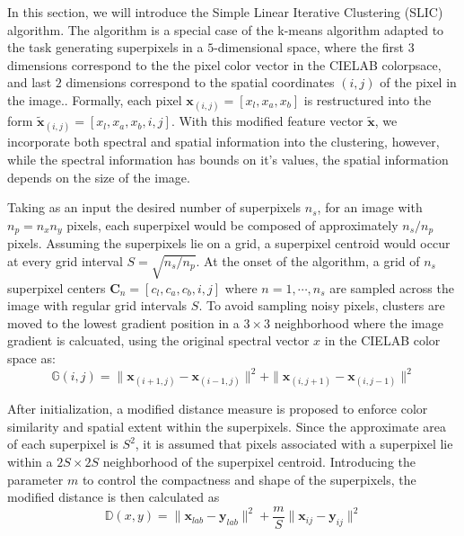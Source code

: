 In this section, we will introduce the Simple Linear Iterative Clustering (SLIC) algorithm. The algorithm is a special case of the k-means algorithm adapted to the task generating superpixels in a $5$-dimensional space, where the first $3$ dimensions correspond to the the pixel color vector in the CIELAB colorpsace, and last $2$ dimensions correspond to the spatial coordinates $(i,j)$ of the pixel in the image.. Formally, each pixel $\mathbf{x}_{(i,j)} = [x_l, x_a, x_b]$ is restructured into the form $\tilde{\mathbf{x}}_{(i,j)} = [x_l, x_a, x_b, i, j]$. With this modified feature vector $\tilde{\mathbf{x}}$, we incorporate both spectral and spatial information into the clustering, however, while the spectral information has bounds on it's values, the spatial information depends on the size of the image. 

Taking as an input the desired number of superpixels $n_s$, for an image with $n_p = n_x n_y$ pixels, each superpixel would be composed of approximately $n_s / n_p$ pixels. Assuming the superpixels lie on a grid, a superpixel centroid would occur at every grid interval $S = \sqrt{n_s/n_p}$. At the onset of the algorithm, a grid of $n_s$ superpixel centers $\mathbf{C}_n = [c_{l}, c_{a}, c_{b}, i, j]$ where $n = 1, \cdots, n_s$ are sampled across the image with regular grid intervals $S$. To avoid sampling noisy pixels, clusters are moved to the lowest gradient position in a $3 \times 3$ neighborhood where the image gradient is calcuated, using the original spectral vector $x$ in the CIELAB color space as:
\begin{equation}
    \label{eq:slic-gradient}
    \mathbb{G}(i,j) = \|\mathbf{x}_{(i+1,j)} - \mathbf{x}_{(i-1,j)} \|^2 + \|\mathbf{x}_{(i,j+1)} - \mathbf{x}_{(i,j-1)} \|^2
\end{equation}

After initialization, a modified distance measure is proposed to enforce color similarity and spatial extent within the superpixels. Since the approximate area of each superpixel is $S^2$, it is assumed that pixels associated with a superpixel lie within a $2S \times 2S$ neighborhood of the superpixel centroid. Introducing the parameter $m$ to control the compactness and shape of the superpixels, the modified distance is then calculated as 
\begin{equation}
    \label{eq:slic-cielab-distance}
    \mathbb{D}(x, y) = \|\mathbf{x}_{lab} - \mathbf{y}_{lab}\|^2 + \frac{m}{S}\|\mathbf{x}_{ij} - \mathbf{y}_{ij}\|^2
\end{equation}

